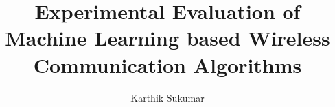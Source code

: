\documentclass[twoside]{msvreport}
\begin{document}
%
%
%
\title{Experimental Evaluation of Machine Learning based Wireless Communication Algorithms}
\author{Karthik Sukumar}



%
\frontmatter
\maketitle
%
%
%

\listoffigures

\listoftables

%
%
\tableofcontents
%
%
%

\mainmatter

\glsaddall
\printglossary[type=\acronymtype,title=Acronyms]








\end{document}
